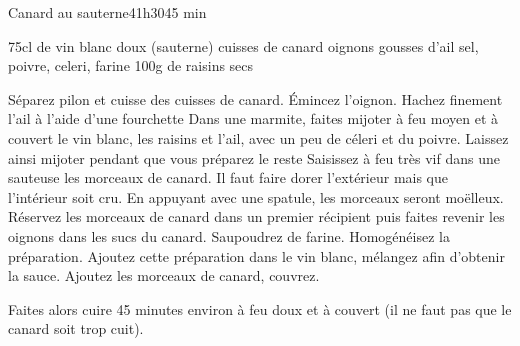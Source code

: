 \begin{recette}{Canard au sauterne}{4}{1h30}{45 min}

\begin{ingredients}
\ingredient 75cl de vin blanc doux (sauterne)
 cuisses de canard
 oignons
 gousses d'ail
\ingredient sel, poivre, celeri, farine
\ingredient 100g de raisins secs
\end{ingredients}

\begin{preparation}
\etape Séparez pilon et cuisse des cuisses de canard. Émincez l'oignon. Hachez 
finement l'ail à l'aide d'une fourchette
\etape Dans une marmite, faites mijoter à feu moyen et à couvert le vin blanc, les raisins et l'ail, avec un peu de céleri et du poivre. 
Laissez ainsi mijoter pendant que vous préparez le reste
\etape Saisissez à feu très vif dans une sauteuse les morceaux de canard. Il faut faire dorer l'extérieur mais que l'intérieur 
soit cru. En appuyant avec une spatule, les morceaux seront moëlleux. 
\etape Réservez les morceaux de canard dans un premier récipient puis faites revenir les oignons dans les sucs du canard. 
\etape Saupoudrez de farine. Homogénéisez la préparation. 
\etape Ajoutez cette préparation dans le vin blanc, mélangez afin d'obtenir la sauce. 
\etape Ajoutez les morceaux de canard, couvrez. 
\end{preparation}

\begin{cuisson}
Faites alors cuire 45 minutes environ à feu doux et à couvert (il ne faut pas que le canard soit trop cuit).
\end{cuisson}
\end{recette}


